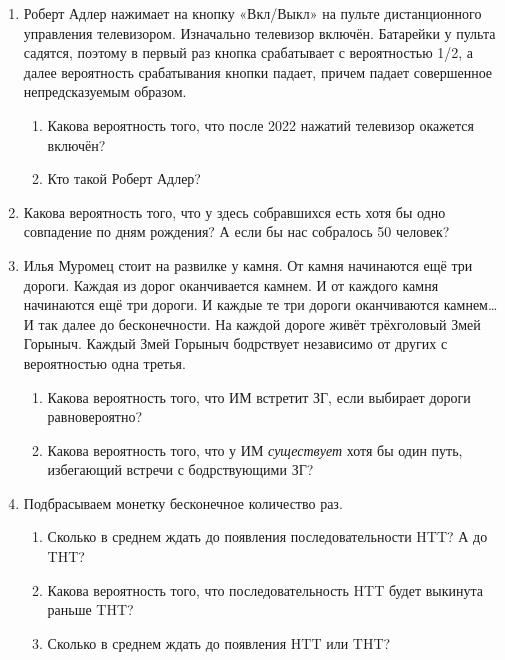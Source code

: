 \documentclass[12pt]{article}
\theoremstyle{definition}
\begin{document}
\newpage

\begin{enumerate}
  \item Роберт Адлер нажимает на кнопку «Вкл/Выкл» на пульте дистанционного
управления телевизором. Изначально телевизор включён. Батарейки
у пульта садятся, поэтому в первый раз кнопка срабатывает с вероятностью
1/2, а далее вероятность срабатывания кнопки падает, причем падает совершенное непредсказуемым образом. 

\begin{enumerate}
  \item Какова вероятность того, что после 2022 нажатий телевизор окажется включён?
  \item Кто такой Роберт Адлер?
\end{enumerate}

\item Какова вероятность того, что у здесь собравшихся есть хотя бы одно совпадение по дням рождения?
А если бы нас собралось 50 человек?

\item Илья Муромец стоит на развилке у камня. От камня начинаются
ещё три дороги. Каждая из дорог оканчивается камнем.
И от каждого камня начинаются ещё три дороги. И каждые те три
дороги оканчиваются камнем\ldots И так далее до бесконечности. На
каждой дороге живёт трёхголовый Змей Горыныч. Каждый Змей
Горыныч бодрствует независимо от других с вероятностью одна третья. 

\begin{enumerate}
  \item Какова вероятность того, что ИМ встретит ЗГ, если выбирает дороги равновероятно?
  \item Какова вероятность того, что у ИМ \textit{существует} хотя бы один путь, избегающий встречи с бодрствующими ЗГ?
\end{enumerate}

\item Подбрасываем монетку бесконечное количество раз. 
\begin{enumerate}
  \item Сколько в среднем ждать до появления последовательности HTT? А до THT? 
  \item Какова вероятность того, что последовательность HTT будет выкинута раньше THT?
  \item Сколько в среднем ждать до появления HTT или THT?
\end{enumerate}


\end{enumerate}
\end{document}
